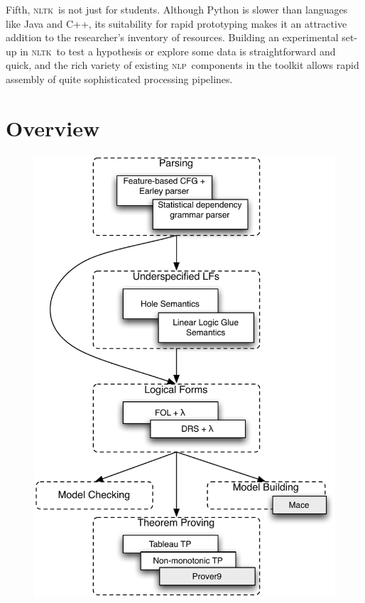 \documentclass[11pt, a4paper]{article}
\newcommand{\NLP}{\textsc{nlp}}
\newcommand{\NLTK}{\textsc{nltk}}
\begin{document}
Fifth, \NLTK\ is not just for students. Although Python is slower than
languages like Java and C++, its suitability for rapid prototyping
makes it an attractive addition to the researcher's inventory of
resources. Building an experimental set-up in \NLTK\ to test a
hypothesis or explore some data is straightforward and quick, and the
rich variety of existing \NLP\ components in the toolkit allows rapid
assembly of quite sophisticated processing pipelines.


\section{Overview}
\label{sec:overview}


\begin{figure}
  \centering
\includegraphics[scale=.6]{modules}  
\end{figure}
\end{document}
